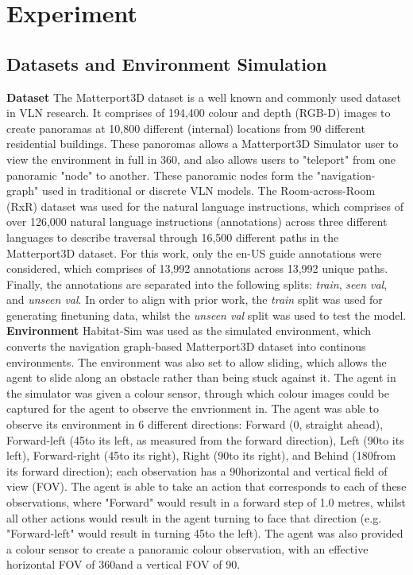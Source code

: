 \documentclass{svproc}
\begin{document}
\section{Experiment}
\subsection{Datasets and Environment Simulation}
    \textbf{Dataset}  The Matterport3D \cite{Matterport3D} dataset is a well known and commonly used dataset in VLN research. It comprises of 194,400 colour and depth (RGB-D) images to create panoramas at 10,800 different (internal) locations from 90 different residential buildings. These panoromas allows a Matterport3D Simulator user to view the environment in full in 360\textdegree, and also allows users to "teleport" from one panoramic "node" to another. These panoramic nodes form the "navigation-graph" used in traditional or discrete VLN models.
    The Room-across-Room (RxR) dataset \cite{mattersim, rxr} was used for the natural language instructions, which comprises of over 126,000 natural language instructions (annotations) across three different languages to describe traversal through 16,500 different paths in the Matterport3D dataset. For this work, only the en-US guide annotations were considered, which comprises of 13,992 annotations across 13,992 unique paths. Finally, the annotations are separated into the following splits: \textit{train}, \textit{seen val}, and \textit{unseen val}. In order to align with prior work, the \textit{train} split was used for generating finetuning data, whilst the \textit{unseen val} split was used to test the model.
    \newline \newline
    \textbf{Environment}  Habitat-Sim \cite{habitat19iccv, szot2021habitat, puig2023habitat3} was used as the simulated environment, which converts the navigation graph-based Matterport3D dataset into continous environments. The environment was also set to allow sliding, which allows the agent to slide along an obstacle rather than being stuck against it. The agent in the simulator was given a colour sensor, through which colour images could be captured for the agent to observe the envrionment in. The agent was able to observe its environment in 6 different directions: Forward (0\textdegree, straight ahead), Forward-left (45\textdegree to its left, as measured from the forward direction), Left (90\textdegree to its left), Forward-right (45\textdegree to its right), Right (90\textdegree to its right), and Behind (180\textdegree from its forward direction); each observation has a 90\textdegree horizontal and vertical field of view (FOV). The agent is able to take an action that corresponds to each of these observations, where "Forward" would result in a forward step of 1.0 metres, whilst all other actions would result in the agent turning to face that direction (e.g. "Forward-left" would result in turning 45\textdegree to the left). The agent was also provided a colour sensor to create a panoramic colour observation, with an effective horizontal FOV of 360\textdegree and a vertical FOV of 90\textdegree.
    
\end{document}
